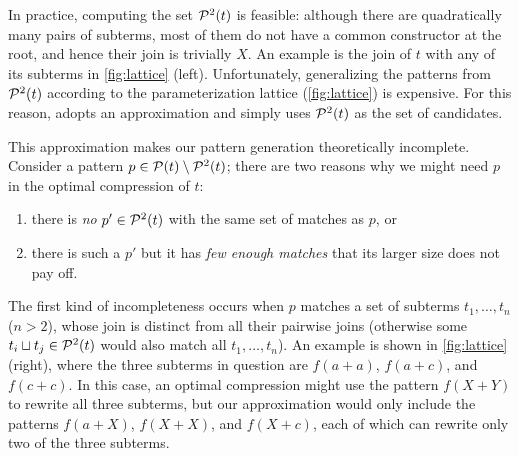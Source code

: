 %
In practice, computing the set $\mathcal{P}^2(t)$ is feasible:
although there are quadratically many pairs of subterms,
most of them do not have a common constructor at the root, and hence their join is trivially $X$.
%
An example is the join of $t$ with any of its subterms in \autoref{fig:lattice} (left).
%
Unfortunately, generalizing the patterns from $\mathcal{P}^2(t)$ 
according to the parameterization lattice (\autoref{fig:lattice}) is expensive.
%
For this reason, \tool adopts an approximation
and simply uses $\mathcal{P}^2(t)$ as the set of candidates.

This approximation makes our pattern generation theoretically incomplete.
%
Consider a pattern $p \in \mathcal{P}(t)\setminus \mathcal{P}^2(t)$;
there are two reasons why we might need $p$ in the optimal compression of $t$:
\begin{enumerate}
  \item there is \emph{no} $p' \in \mathcal{P}^2(t)$ with the same set of matches as $p$, or
  \item there is such a $p'$ but it has \emph{few enough matches} 
  that its larger size does not pay off. 
\end{enumerate}
%

The first kind of incompleteness occurs when $p$ matches a set of subterms $t_1, \ldots, t_n$ ($n > 2$),
whose join is distinct from all their pairwise joins
(otherwise some $t_i \sqcup t_j \in \mathcal{P}^2(t)$ would also match all $t_1, \ldots, t_n$).
%
An example is shown in \autoref{fig:lattice} (right),
where the three subterms in question are $f(a+a)$, $f(a+c)$, and $f(c+c)$.
%
In this case, an optimal compression might use the pattern $f(X+Y)$ to rewrite all three subterms,
but our approximation would only include the patterns $f(a+X)$, $f(X+X)$, and $f(X+c)$,
each of which can rewrite only two of the three subterms.


